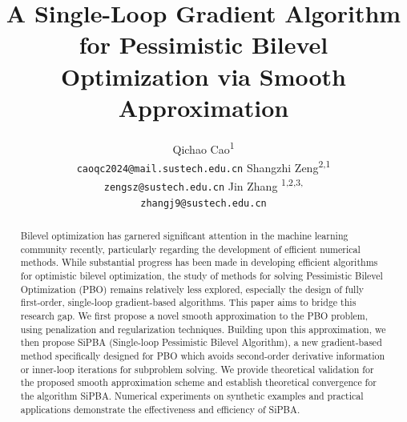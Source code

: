 \documentclass{article}
\title{ A Single-Loop Gradient Algorithm for Pessimistic Bilevel Optimization via Smooth Approximation}
\author{
Qichao Cao\textsuperscript{1} \\
\texttt{caoqc2024@mail.sustech.edu.cn}
\And
Shangzhi Zeng\textsuperscript{2,1} \\
\texttt{zengsz@sustech.edu.cn}
\And
Jin Zhang \textsuperscript{1,2,3,\footnotemark[1]}\\
\texttt{zhangj9@sustech.edu.cn}
}
\begin{document}
\maketitle

\begingroup
\renewcommand{\thefootnote}{\fnsymbol{footnote}}
\endgroup
\begin{abstract}
Bilevel optimization has garnered significant attention in the machine learning community recently, particularly regarding the development of efficient numerical methods. 
While substantial progress has been made in developing efficient algorithms for optimistic bilevel optimization, the study of methods for solving Pessimistic Bilevel Optimization (PBO) remains relatively less explored, 
especially the design of fully first-order, single-loop gradient-based algorithms. This paper aims to bridge this research gap. We first propose a novel smooth approximation to the PBO problem, using penalization and regularization techniques. Building upon this approximation, we then propose SiPBA (Single-loop Pessimistic Bilevel Algorithm), a new gradient-based method specifically designed for PBO which avoids second-order derivative information or inner-loop iterations for subproblem solving. We provide theoretical validation for the proposed smooth approximation scheme and establish theoretical convergence for the algorithm SiPBA. Numerical experiments on synthetic examples and practical applications demonstrate the effectiveness and efficiency of SiPBA. 
\end{abstract}
\end{document}
